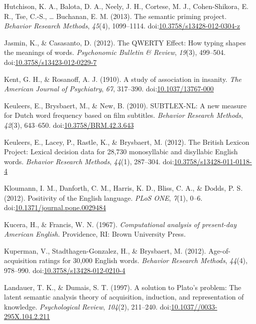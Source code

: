 \documentclass[english,man]{apa6}
\theoremstyle{definition}
\theoremstyle{definition}
\theoremstyle{definition}
\theoremstyle{remark}
\begin{document}
\hypertarget{ref-Hutchison2013}{}
Hutchison, K. A., Balota, D. A., Neely, J. H., Cortese, M. J.,
Cohen-Shikora, E. R., Tse, C.-S., \ldots{} Buchanan, E. M. (2013). The
semantic priming project. \emph{Behavior Research Methods},
\emph{45}(4), 1099--1114.
doi:\href{https://doi.org/10.3758/s13428-012-0304-z}{10.3758/s13428-012-0304-z}

\hypertarget{ref-Jasmin2012}{}
Jasmin, K., \& Casasanto, D. (2012). The QWERTY Effect: How typing
shapes the meanings of words. \emph{Psychonomic Bulletin \& Review},
\emph{19}(3), 499--504.
doi:\href{https://doi.org/10.3758/s13423-012-0229-7}{10.3758/s13423-012-0229-7}

\hypertarget{ref-Kent1910}{}
Kent, G. H., \& Rosanoff, A. J. (1910). A study of association in
insanity. \emph{The American Journal of Psychiatry}, \emph{67},
317--390.
doi:\href{https://doi.org/10.1037/13767-000}{10.1037/13767-000}

\hypertarget{ref-Keuleers2010}{}
Keuleers, E., Brysbaert, M., \& New, B. (2010). SUBTLEX-NL: A new
measure for Dutch word frequency based on film subtitles. \emph{Behavior
Research Methods}, \emph{42}(3), 643--650.
doi:\href{https://doi.org/10.3758/BRM.42.3.643}{10.3758/BRM.42.3.643}

\hypertarget{ref-Keuleers2012}{}
Keuleers, E., Lacey, P., Rastle, K., \& Brysbaert, M. (2012). The
British Lexicon Project: Lexical decision data for 28,730 monosyllabic
and disyllabic English words. \emph{Behavior Research Methods},
\emph{44}(1), 287--304.
doi:\href{https://doi.org/10.3758/s13428-011-0118-4}{10.3758/s13428-011-0118-4}

\hypertarget{ref-Kloumann2012}{}
Kloumann, I. M., Danforth, C. M., Harris, K. D., Bliss, C. A., \& Dodds,
P. S. (2012). Positivity of the English language. \emph{PLoS ONE},
\emph{7}(1), 0--6.
doi:\href{https://doi.org/10.1371/journal.pone.0029484}{10.1371/journal.pone.0029484}

\hypertarget{ref-Kucera1967}{}
Kucera, H., \& Francis, W. N. (1967). \emph{Computational analysis of
present-day American English.} Providence, RI: Brown University Press.

\hypertarget{ref-Kuperman2012}{}
Kuperman, V., Stadthagen-Gonzalez, H., \& Brysbaert, M. (2012).
Age-of-acquisition ratings for 30,000 English words. \emph{Behavior
Research Methods}, \emph{44}(4), 978--990.
doi:\href{https://doi.org/10.3758/s13428-012-0210-4}{10.3758/s13428-012-0210-4}

\hypertarget{ref-Landauer1997}{}
Landauer, T. K., \& Dumais, S. T. (1997). A solution to Plato's problem:
The latent semantic analysis theory of acquisition, induction, and
representation of knowledge. \emph{Psychological Review}, \emph{104}(2),
211--240.
doi:\href{https://doi.org/10.1037//0033-295X.104.2.211}{10.1037//0033-295X.104.2.211}
\end{document}
